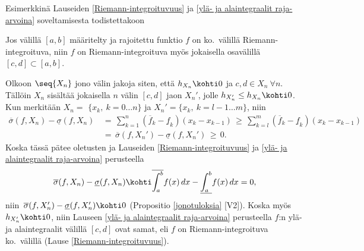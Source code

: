 Esimerkkinä Lauseiden \ref{Riemann-integroituvuus} ja \ref{ylä- ja alaintegraalit raja-arvoina}
soveltamisesta todistettakoon
\begin{Lause} \label{integroituvuus osavälillä} 
Jos välillä $[a,b]$ määritelty ja rajoitettu funktio $f$ on ko.\ välillä  Riemann-integroituva,
niin $f$ on Riemann-integroituva myös jokaisella osavälillä $[c,d]\subset[a,b]$.
\end{Lause}
\tod Olkoon $\seq{X_n}$ jono välin jakoja siten, että $h_{X_n} \kohti 0$ ja
$c,d \in X_n\ \forall n$. Tällöin $X_n$ sisältää jokaisella $n$ välin $[c,d]$ jaon $X_n'$,
jolle $h_{X_n'} \le h_{X_n} \kohti 0$. Kun merkitään $X_n=$ $\{x_k,\ k=0 \ldots n\}$ ja
$X_n'=\{x_k,\ k=l-1 \ldots m\}$, niin
\begin{align*}
\overline{\sigma}(f,X_n)-\underline{\sigma}(f,X_n)
&\,=\, \sum_{k=1}^n (\overline{f}_k-\underline{f}_k)(x_k-x_{k-1})
 \,\ge\, \sum_{k=l}^m (\overline{f}_k-\underline{f}_k)(x_k-x_{k-1}) \\
&\,=\, \overline{\sigma}(f,X_n')-\underline{\sigma}(f,X_n') \,\ge\,0.
\end{align*}
Koska tässä pätee oletusten ja Lauseiden \ref{Riemann-integroituvuus} ja 
\ref{ylä- ja alaintegraalit raja-arvoina} perusteella 
\[
\overline{\sigma}(f,X_n)-\underline{\sigma}(f,X_n) 
\kohti \overline{\int_a^b} f(x)\,dx - \underline{\int_a^b} f(x)\,dx = 0,
\]
niin $\,\overline{\sigma}(f,X_n')-\underline{\sigma}(f,X_n') \kohti 0$ (Propositio
\ref{jonotuloksia} [V2]). Koska myös $h_{X_n'} \kohti 0$, niin Lauseen
\ref{ylä- ja alaintegraalit raja-arvoina} perusteella $f$:n ylä- ja alaintegraalit välillä 
$[c,d]$ ovat samat, eli $f$ on Riemann-integroituva ko.\ välillä
(Lause \ref{Riemann-integroituvuus}). \loppu

